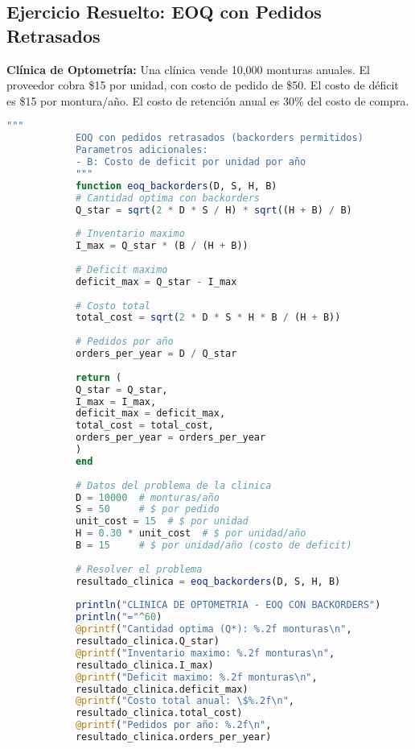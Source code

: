 \documentclass[12pt,a4paper]{book}
\begin{document}
	\subsection{Ejercicio Resuelto: EOQ con Pedidos Retrasados}
	
	\begin{tcolorbox}[enhanced,colback=naranjaclaro,colframe=naranjaacento,boxrule=2pt,arc=8pt,
		drop shadow,title={\bfseries\color{white} \faPuzzlePiece\ PROBLEMA}]
		
		\textbf{Cl\'inica de Optometr\'ia:} Una cl\'inica vende 10,000 monturas anuales. El proveedor cobra \$15 por unidad, con costo de pedido de \$50. El costo de d\'eficit es \$15 por montura/a\~no. El costo de retenci\'on anual es 30\% del costo de compra.
		
	\end{tcolorbox}
	
	\begin{tcolorbox}[enhanced,colback=azulclaro,colframe=azulprincipal,boxrule=2pt,arc=8pt,
		title={\bfseries\color{white} \faCode\ SOLUCI\'ON EN JULIA},breakable]
		
		\begin{lstlisting}[language=Julia,basicstyle=\footnotesize\ttfamily]
			"""
			EOQ con pedidos retrasados (backorders permitidos)
			Parametros adicionales:
			- B: Costo de deficit por unidad por año
			"""
			function eoq_backorders(D, S, H, B)
			# Cantidad optima con backorders
			Q_star = sqrt(2 * D * S / H) * sqrt((H + B) / B)
			
			# Inventario maximo
			I_max = Q_star * (B / (H + B))
			
			# Deficit maximo
			deficit_max = Q_star - I_max
			
			# Costo total
			total_cost = sqrt(2 * D * S * H * B / (H + B))
			
			# Pedidos por año
			orders_per_year = D / Q_star
			
			return (
			Q_star = Q_star,
			I_max = I_max,
			deficit_max = deficit_max,
			total_cost = total_cost,
			orders_per_year = orders_per_year
			)
			end
			
			# Datos del problema de la clinica
			D = 10000  # monturas/año
			S = 50     # $ por pedido
			unit_cost = 15  # $ por unidad
			H = 0.30 * unit_cost  # $ por unidad/año
			B = 15     # $ por unidad/año (costo de deficit)
			
			# Resolver el problema
			resultado_clinica = eoq_backorders(D, S, H, B)
			
			println("CLINICA DE OPTOMETRIA - EOQ CON BACKORDERS")
			println("="^60)
			@printf("Cantidad optima (Q*): %.2f monturas\n", 
			resultado_clinica.Q_star)
			@printf("Inventario maximo: %.2f monturas\n", 
			resultado_clinica.I_max)
			@printf("Deficit maximo: %.2f monturas\n", 
			resultado_clinica.deficit_max)
			@printf("Costo total anual: \$%.2f\n", 
			resultado_clinica.total_cost)
			@printf("Pedidos por año: %.2f\n", 
			resultado_clinica.orders_per_year)
		\end{lstlisting}
		
	\end{tcolorbox}
	
\end{document}
